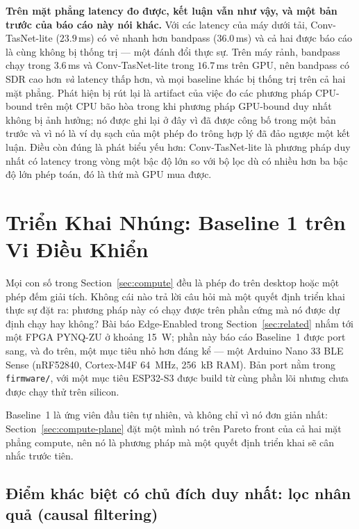 \documentclass[11pt]{article}
\begin{document}
\textbf{Trên mặt phẳng latency đo được, kết luận vẫn như vậy, và một bản
trước của báo cáo này nói khác.} Với các latency của máy dưới tải,
Conv-TasNet-lite ($23.9$\,ms) có vẻ nhanh hơn bandpass ($36.0$\,ms) và cả
hai được báo cáo là cùng không bị thống trị --- một đánh đổi thực sự. Trên
máy rảnh, bandpass chạy trong $3.6$\,ms và Conv-TasNet-lite trong
$16.7$\,ms trên GPU, nên bandpass có SDR cao hơn \emph{và} latency thấp
hơn, và mọi baseline khác bị thống trị trên cả hai mặt phẳng. Phát hiện
bị rút lại là artifact của việc đo các phương pháp CPU-bound trên một CPU
bão hòa trong khi phương pháp GPU-bound duy nhất không bị ảnh hưởng; nó
được ghi lại ở đây vì đã được công bố trong một bản trước và vì nó là ví
dụ sạch của một phép đo trông hợp lý đã đảo ngược một kết luận. Điều còn
đúng là phát biểu yếu hơn: Conv-TasNet-lite là phương pháp duy nhất có
latency trong vòng một bậc độ lớn so với bộ lọc dù có nhiều hơn ba bậc độ
lớn phép toán, đó là thứ mà GPU mua được.

\section{Triển Khai Nhúng: Baseline 1 trên Vi Điều Khiển}
\label{sec:firmware}

Mọi con số trong Section~\ref{sec:compute} đều là phép đo trên desktop
hoặc một phép đếm giải tích. Không cái nào trả lời câu hỏi mà một quyết
định triển khai thực sự đặt ra: phương pháp này có chạy được trên phần
cứng mà nó được dự định chạy hay không? Bài báo Edge-Enabled
\cite{edgelung} trong Section~\ref{sec:related} nhắm tới một FPGA PYNQ-ZU
ở khoảng 15~W; phần này báo cáo Baseline~1 được port sang, và đo trên, một
mục tiêu nhỏ hơn đáng kể --- một Arduino Nano 33 BLE Sense (nRF52840,
Cortex-M4F 64~MHz, 256~kB RAM). Bản port nằm trong \texttt{firmware/}, với
một mục tiêu ESP32-S3 được build từ cùng phần lõi nhưng chưa được chạy
thử trên silicon.

Baseline~1 là ứng viên đầu tiên tự nhiên, và không chỉ vì nó đơn giản
nhất: Section~\ref{sec:compute-plane} đặt một mình nó trên Pareto front
của cả hai mặt phẳng compute, nên nó là phương pháp mà một quyết định
triển khai sẽ cân nhắc trước tiên.

\subsection{Điểm khác biệt có chủ đích duy nhất: lọc nhân quả (causal filtering)}
\label{sec:firmware-causal}
\end{document}
